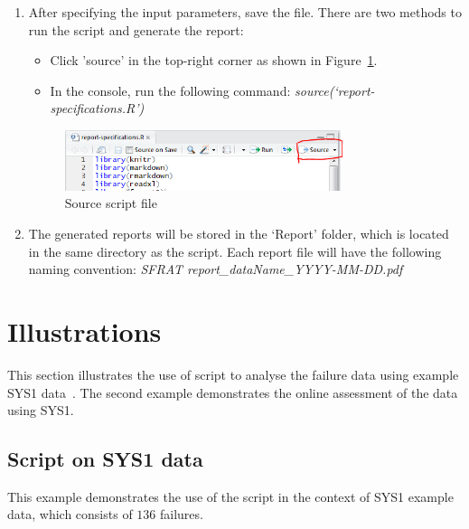 \documentclass[conference]{IEEEtran}
\begin{document}
\begin{enumerate}
  \item{After specifying the input parameters, save the file. There are two methods to run the script and generate the report: 
  \begin{itemize}
  \item {Click 'source' in the top-right corner as shown in Figure~\ref{fig:scriptsource}.}
  \item {In the console, run the following command: \textit{source(‘report-specifications.R’)}}
\end{itemize}  
        \begin{figure}[!h]
        \centering
        \includegraphics[width=3.2in]{Figures/scriptsource}
        \caption{Source script file}
        \label{fig:scriptsource}
        \end{figure}
  }

  \item {The generated reports will be stored in the `Report' folder, which is located in the same directory as the script. Each report file will have the following naming convention: 
  \newline
  \textit{SFRAT report\_dataName\_YYYY-MM-DD.pdf}}
\end{enumerate}


\section{Illustrations}\label{sec:Ex}
This section illustrates the use of script to analyse the failure data using example SYS1 data~\cite{BookHoSRE}. The second example demonstrates the online assessment of the data using SYS1.

\subsection{Script on SYS1 data}\label{sec:Ex:Script}
This example demonstrates the use of the script in the context of SYS1 example data, which consists of $136$ failures. 
\end{document}
